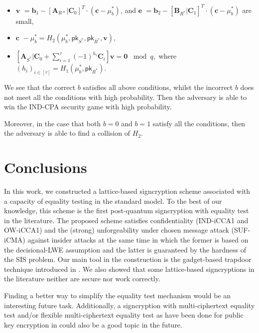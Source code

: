 \documentclass[a4paper,11pt,onecolumn]{elsarticle}
\begin{document}
\begin{itemize}
	\item $\textbf{v }= \textbf{b}_1- [\textbf{A}_{R*} | \textbf{C}_0]^T \cdot (\textbf{c} - \mu^*_b)
$,  and 
$\textbf{e }= \textbf{b}_2 -[\textbf{B}_{R^*} | \textbf{C}_1]^T \cdot (\textbf{c} - \mu^*_b)
$
are small, 
\item
 $\textbf{c }- \mu^*_b = H_2(\mu^*_b, \textsf{pk}_{S^*}, \textsf{pk}_{R^*}, \textbf{v})$,
\item $ [\textbf{A}_{S^*} | \textbf{C}_0 + \sum^\tau_{i=1}(-1)^{h_i}\textbf{C}_i] \textbf{v} = \textbf{0 }\bmod q
,$ where $(h_i)_{i\in [\tau]}=H_1(\mu^*_b, \textsf{pk}_{R^*})$.
\end{itemize}
We see that the correct $b$ satisfies all above conditions, whilst the incorrect $b $ does not meet all the conditions with high probability. Then the adversary is able to
win the IND-CPA security game with high probability.

Moreover,  in the case that  both $b = 0$ and $b=1$ satisfy all the conditions, then the adversary is able to find a collision of
$H_2$.



	\section{Conclusions} \label{conc}
	In this work, we constructed a lattice-based signcryption scheme associated with a capacity of equality testing in the standard model. To the best of our knowledge, this scheme is the first post-quantum signcryption with equality test  in the literature. The proposed scheme satisfies confidentiality (IND-iCCA1 and OW-iCCA1) and the (strong) unforgeability under chosen message attack (SUF-iCMA) against insider attacks at the same time in which the former is based on the decisional-LWE assumption and the latter is guaranteed by the hardness of the SIS problem. Our main tool in the construction is the gadget-based trapdoor technique introduced in \cite{MP12}.  We also showed that some lattice-based signcryptions in the literature   neither are secure nor  work correctly.  
	
	Finding a better way to simplify the equality test mechanism would be an interesting future task.  Additionally, a signcryption with multi-ciphertext equality test  and/or flexible multi-ciphertext equality test as have been done for public key encryption in \cite{SGZW20} could also be a good topic in the future. 
	
\end{document}
